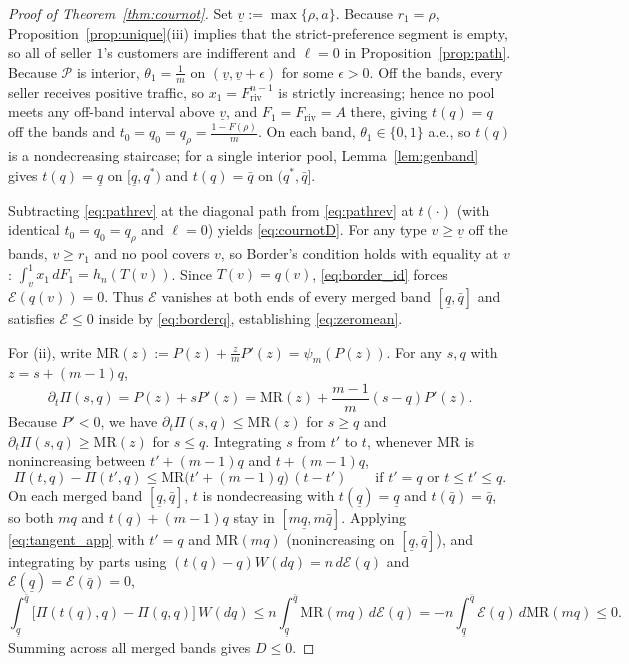 \documentclass[12pt]{article}
\theoremstyle{mystyle}
\theoremstyle{mystyle2}
\newcommand{\cP}{\mathcal{P}}
\newcommand{\1}{\mathbf{1}}
\begin{document}
\begin{proof}[Proof of Theorem~\ref{thm:cournot}]
Set $\underline v:=\max\{\rho,a\}$. Because $r_1=\rho$, Proposition~\ref{prop:unique}(iii) implies that the strict-preference segment is empty, so all of seller $1$'s customers are indifferent and $\ell=0$ in Proposition~\ref{prop:path}. Because $\cP$ is interior, $\theta_1=\frac{1}{m}$ on $(\underline v,\underline v+\epsilon)$ for some $\epsilon>0$. Off the bands, every seller receives positive traffic, so $x_1=F_{\mathrm{riv}}^{n-1}$ is strictly increasing; hence no pool meets any off-band interval above $\underline v$, and $F_1=F_{\mathrm{riv}}=A$ there, giving $t(q)=q$ off the bands and $t_0=q_0=q_{\rho}=\frac{1-F(\rho)}{m}$. On each band, $\theta_1\in\{0,1\}$ a.e., so $t(q)$ is a nondecreasing staircase; for a single interior pool, Lemma~\ref{lem:genband} gives $t(q)=\underline q$ on $[\underline q,q^*)$ and $t(q)=\bar q$ on $(q^*,\bar q]$.

Subtracting \eqref{eq:pathrev} at the diagonal path from \eqref{eq:pathrev} at $t(\cdot)$ (with identical $t_0=q_0=q_{\rho}$ and $\ell=0$) yields \eqref{eq:cournotD}. For any type $v\ge\underline v$ off the bands, $v\ge r_1$ and no pool covers $v$, so Border's condition holds with equality at $v$: $\int_v^1 x_1\,dF_1=h_n(T(v))$. Since $T(v)=q(v)$, \eqref{eq:border_id} forces $\mathcal E(q(v))=0$. Thus $\mathcal E$ vanishes at both ends of every merged band $[\underline q,\bar q]$ and satisfies $\mathcal E\le 0$ inside by \eqref{eq:borderq}, establishing \eqref{eq:zeromean}.

For (ii), write $\mathrm{MR}(z):=P(z)+\frac{z}{m}P'(z)=\psi_m(P(z))$. For any $s,q$ with $z=s+(m-1)q$,
\[
\partial_t\Pi(s,q) = P(z) + s P'(z) = \mathrm{MR}(z) + \frac{m-1}{m}(s-q)P'(z).
\]
Because $P'<0$, we have $\partial_t\Pi(s,q)\le\mathrm{MR}(z)$ for $s\ge q$ and $\partial_t\Pi(s,q)\ge\mathrm{MR}(z)$ for $s\le q$. Integrating $s$ from $t'$ to $t$, whenever $\mathrm{MR}$ is nonincreasing between $t'+(m-1)q$ and $t+(m-1)q$,
\begin{equation}\label{eq:tangent_app}
\Pi(t,q) - \Pi(t',q) \le \mathrm{MR}\bigl(t'+(m-1)q\bigr)\,(t-t') \qquad \text{if } t'=q \text{ or } t\le t'\le q.
\end{equation}
On each merged band $[\underline q,\bar q]$, $t$ is nondecreasing with $t(\underline q)=\underline q$ and $t(\bar q)=\bar q$, so both $mq$ and $t(q)+(m-1)q$ stay in $[m\underline q,m\bar q]$. Applying \eqref{eq:tangent_app} with $t'=q$ and $\mathrm{MR}(mq)$ (nonincreasing on $[\underline q,\bar q]$), and integrating by parts using $(t(q)-q)W(dq)=n\,d\mathcal E(q)$ and $\mathcal E(\underline q)=\mathcal E(\bar q)=0$,
\[
\int_{\underline q}^{\bar q}\bigl[\Pi(t(q),q)-\Pi(q,q)\bigr]\,W(dq) \le n\int_{\underline q}^{\bar q}\mathrm{MR}(mq)\,d\mathcal E(q) = -n\int_{\underline q}^{\bar q}\mathcal E(q)\,d\mathrm{MR}(mq) \le 0.
\]
Summing across all merged bands gives $D\le 0$.
\end{proof}
\end{document}
